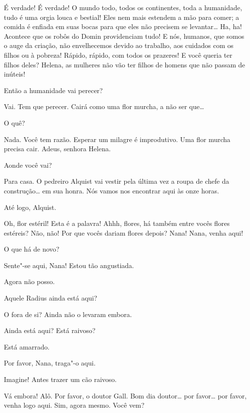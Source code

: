  É verdade! É verdade! O mundo todo, todos os continentes, toda a
humanidade, tudo é uma orgia louca e bestial! Eles nem mais estendem a mão para
comer; a comida é enfiada em suas bocas para que eles não precisem se
levantar\ldots{} Ha, ha! Acontece que os robôs do Domin providenciam tudo! E nós,
humanos, que somos o auge da criação, não envelhecemos devido ao trabalho,
aos cuidados com os filhos ou à pobreza! Rápido, rápido, com todos os prazeres! E você
queria ter filhos deles? Helena, as mulheres não vão ter filhos de homens que
não passam de inúteis!

 Então a humanidade vai perecer?

 Vai. Tem que perecer. Cairá como uma flor murcha, a não ser que\ldots{}

 O quê?

 Nada. Você tem razão. Esperar um milagre é improdutivo. Uma flor murcha
precisa cair. Adeus, senhora Helena.

 Aonde você vai?

 Para casa. O pedreiro Alquist vai vestir pela última vez a roupa
de chefe da construção\ldots{} em sua honra. Nós vamos nos encontrar aqui às onze
horas.

 Até logo, Alquist.

  Oh, flor estéril! Esta é a palavra!  Ahhh, flores, há também entre vocês flores estéreis?
Não, não! Por que vocês dariam flores depois?  Nana! Nana, venha
aqui!

  O que há de novo?

 Sente"-se aqui, Nana! Estou tão angustiada.

 Agora não posso.

 Aquele Radius ainda está aqui?

 O fora de si? Ainda não o levaram embora.

 Ainda está aqui? Está raivoso?

 Está amarrado.

 Por favor, Nana, traga"-o aqui.

 Imagine! Antes trazer um cão raivoso.

 Vá embora! 
Alô. Por favor, o doutor Gall. Bom dia doutor\ldots{} por favor\ldots{} por
favor, venha logo aqui. Sim, agora mesmo. Você vem? 

